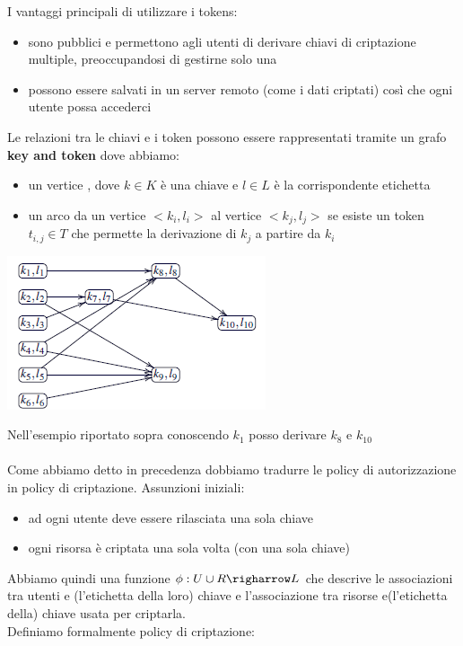 I vantaggi principali di utilizzare i tokens:
\begin{itemize}
    \item sono pubblici e permettono agli utenti di derivare chiavi di criptazione multiple, preoccupandosi di gestirne solo una
    \item possono essere salvati in un server remoto (come i dati criptati) così che ogni utente possa accederci
\end{itemize}
Le relazioni tra le chiavi e i token possono essere rappresentati tramite un grafo \textbf{key and token} dove abbiamo:
\begin{itemize}
    \item un vertice \(<k,l>\), dove \(k \in K\) è una chiave e \(l \in L\) è la corrispondente etichetta
    \item un arco da un vertice \(<k_i,l_i>\) al vertice \(<k_j,l_j>\) se esiste un token \(t_{i,j} \in T\) che permette la derivazione di \(k_j\) a partire da \(k_i\)
\end{itemize}
\begin{center}
    \includegraphics[scale=0.7]{img/ktgrafo.png}
\end{center}
Nell'esempio riportato sopra conoscendo \(k_1\) posso derivare \(k_8\) e \(k_10\) \\\\
Come abbiamo detto in precedenza dobbiamo tradurre le policy di autorizzazione in policy di criptazione. Assunzioni iniziali:
\begin{itemize}
    \item ad ogni utente deve essere rilasciata una sola chiave
    \item ogni risorsa è criptata una sola volta (con una sola chiave)
\end{itemize}
Abbiamo quindi una funzione \(\phi : U \cup R \righarrow L \) che descrive le associazioni tra utenti e (l'etichetta della loro) chiave e l'associazione tra risorse e(l'etichetta della) chiave usata per criptarla.\\
Definiamo formalmente policy di criptazione:\\
